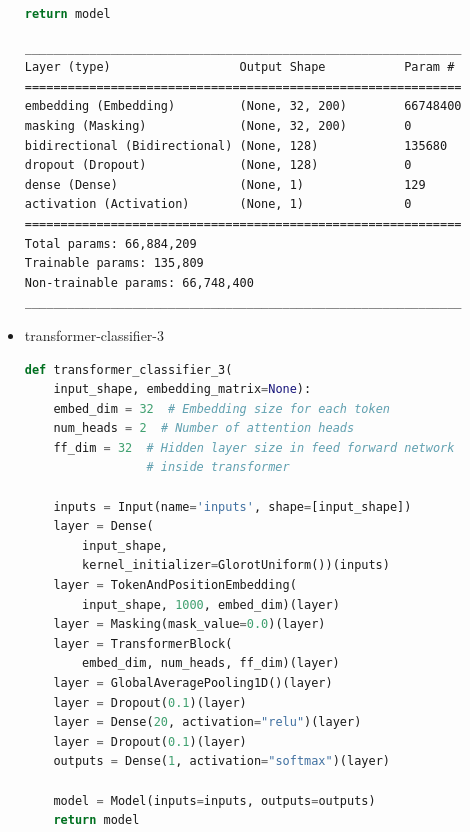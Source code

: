 \documentclass{article}
\begin{document}
\begin{itemize}
\begin{lstlisting}[language=Python, caption=Дефиниция на bi-lstm-classifier-4.]
    return model
\end{lstlisting}

\begin{lstlisting}[numbers=none, caption=Обобщение на bi-lstm-classifier-4.]
_____________________________________________________________
Layer (type)                  Output Shape           Param #
=============================================================
embedding (Embedding)         (None, 32, 200)        66748400
masking (Masking)             (None, 32, 200)        0
bidirectional (Bidirectional) (None, 128)            135680
dropout (Dropout)             (None, 128)            0
dense (Dense)                 (None, 1)              129
activation (Activation)       (None, 1)              0
=============================================================
Total params: 66,884,209
Trainable params: 135,809
Non-trainable params: 66,748,400
_____________________________________________________________
\end{lstlisting}

  \item transformer-classifier-3

\begin{lstlisting}[language=Python, caption=Дефиниция на transformer-classifier-3.]
def transformer_classifier_3(
    input_shape, embedding_matrix=None):
    embed_dim = 32  # Embedding size for each token
    num_heads = 2  # Number of attention heads
    ff_dim = 32  # Hidden layer size in feed forward network
                 # inside transformer

    inputs = Input(name='inputs', shape=[input_shape])
    layer = Dense(
        input_shape,
        kernel_initializer=GlorotUniform())(inputs)
    layer = TokenAndPositionEmbedding(
        input_shape, 1000, embed_dim)(layer)
    layer = Masking(mask_value=0.0)(layer)
    layer = TransformerBlock(
        embed_dim, num_heads, ff_dim)(layer)
    layer = GlobalAveragePooling1D()(layer)
    layer = Dropout(0.1)(layer)
    layer = Dense(20, activation="relu")(layer)
    layer = Dropout(0.1)(layer)
    outputs = Dense(1, activation="softmax")(layer)

    model = Model(inputs=inputs, outputs=outputs)
    return model
\end{lstlisting}


\end{itemize}
\end{document}
